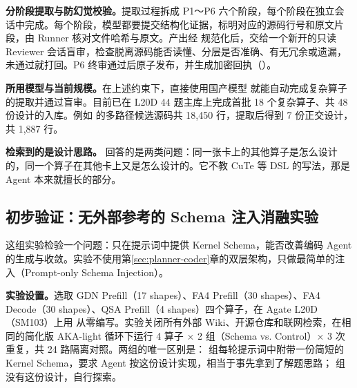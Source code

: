 \begin{DiagramBlock}
\end{DiagramBlock}
\textbf{分阶段提取与防幻觉校验。}提取过程拆成 P1～P6 六个阶段，每个阶段在独立会话中完成。每个阶段，模型都要提交结构化证据，标明对应的源码行号和原文片段，由 Runner 核对文件哈希与原文。产出经  规范化后，交给一个新开的只读 Reviewer 会话盲审，检查脱离源码能否读懂、分层是否准确、有无冗余或遗漏，未通过就打回。P6 终审通过后原子发布，并生成加密回执（）。


\textbf{所用模型与当前规模。}在上述约束下，直接使用国产模型  就能自动完成复杂算子的提取并通过盲审。目前已在 L20D 44 题主库上完成首批 18 个复杂算子、共 48 份设计的入库。例如  的多路径候选源码共 18,450 行，提取后得到 7 份正交设计，共 1,887 行。


\textbf{检索到的是设计思路。} 回答的是两类问题：同一张卡上的其他算子是怎么设计的，同一个算子在其他卡上又是怎么设计的。它不教 CuTe 等 DSL 的写法，那是 Agent 本来就擅长的部分。

\newpage

\subsection{初步验证：无外部参考的 Schema 注入消融实验}\label{sec:schema-ablation}
这组实验检验一个问题：只在提示词中提供 Kernel Schema，能否改善编码 Agent 的生成与收敛。实验不使用第\ref{sec:planner-coder}章的双层架构，只做最简单的注入（Prompt-only Schema Injection）。


\textbf{实验设置。}选取 GDN Prefill（17 shapes）、FA4 Prefill（30 shapes）、FA4 Decode（30 shapes）、QSA Prefill（4 shapes）四个算子，在 Agate L20D（SM103）上用  从零编写。实验关闭所有外部 Wiki、开源仓库和联网检索，在相同的简化版 AKA-light 循环下运行 4 算子 × 2 组（Schema vs. Control）× 3 次重复，共 24 路隔离对照。两组的唯一区别是： 组每轮提示词中附带一份简短的 Kernel Schema，要求 Agent 按这份设计实现，相当于事先拿到了解题思路； 组没有这份设计，自行探索。

